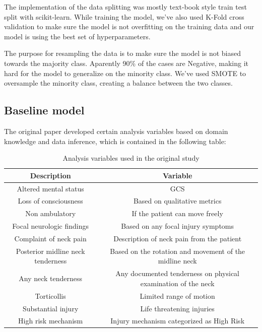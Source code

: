 \documentclass[10pt,letterpaper]{article}
\begin{document}
The implementation of the data splitting was mostly text-book style train test split with scikit-learn. While training the model, we've also used K-Fold cross validation to make sure the model is not overfitting on the training data and our model is using the best set of hyperparameters.

The purpose for resampling the data is to make sure the model is not biased towards the majority class. Aparently 90\% of the cases are Negative, making it hard for the model to generalize on the minority class. We've used SMOTE to oversample the minority class, creating a balance between the two classes.

\subsection{Baseline model}
The original paper \cite{leonard2011factors} developed certain analysis variables based on domain knowledge and data inference, which is contained in the following table:

\begin{table}[H]
\centering
\begin{tabular}{cc}
\textbf{Description}              & \textbf{Variable}                                             \\ \hline
Altered mental status             & GCS                                                           \\
Loss of consciousness             & Based on qualitative metrics                                                              \\
Non ambulatory                    & If the patient can move freely                                                              \\
Focal neurologic findings        &  Based on any focal injury symptoms                                                             \\
Complaint of neck pain            &  Description of neck pain from the patient                                                             \\
Posterior midline neck tenderness &  Based on the rotation and movement of the midline neck                                                             \\
Any neck tenderness               & Any documented tenderness on physical examination of the neck \\
Torticollis                       & Limited range of motion                                       \\
Substantial injury                & Life threatening injuries                                     \\
High risk mechanism               & Injury mechanism categorized as High Risk                     \\ \hline
\end{tabular}
\caption{Analysis variables used in the original study \cite{leonard2011factors}}
\label{tab:base_variables}
\end{table}
\end{document}
